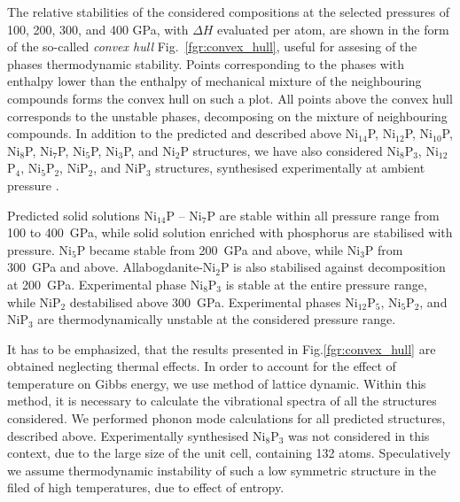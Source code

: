 \documentclass[twoside,twocolumn,9pt]{article}
\begin{document}
The relative stabilities of the considered compositions at the selected pressures of 100, 200, 300, and 400 GPa, with $\Delta H$ evaluated per atom, are shown in the form of the so-called {\it convex hull} Fig.~\ref{fgr:convex_hull}, useful for assesing of the phases thermodynamic stability. 
Points corresponding to the phases with enthalpy lower than the enthalpy of mechanical mixture of the neighbouring compounds forms the convex hull on such a plot.
All points above the convex hull corresponds to the unstable phases, decomposing on the mixture of neighbouring compounds.
In addition to the predicted and described above Ni$_{14}$P, Ni$_{12}$P, Ni$_{10}$P, Ni$_8$P, Ni$_7$P, Ni$_5$P, Ni$_3$P, and Ni$_2$P structures, we have also considered Ni$_8$P$_3$, Ni$_12$P$_4$, Ni$_5$P$_2$, NiP$_2$, and NiP$_3$ structures, synthesised experimentally at ambient pressure \cite{}.

Predicted solid solutions Ni$_{14}$P -- Ni$_7$P are stable within all pressure range from 100 to 400~GPa, while solid solution enriched with phosphorus are stabilised with pressure.
Ni$_5$P became stable from  200~GPa and above, while Ni$_3$P from 300~GPa and above. Allabogdanite-Ni$_2$P is also stabilised against decomposition at 200~GPa.
Experimental phase Ni$_8$P$_3$ is stable at the entire pressure range, while NiP$_2$ destabilised above 300~GPa. Experimental phases Ni$_12$P$_5$, Ni$_5$P$_2$, and NiP$_3$ are thermodynamically unstable at the considered pressure range.

It has to be emphasized, that the results presented in Fig.\ref{fgr:convex_hull} are obtained neglecting thermal effects. 
In order to account for the effect of temperature on Gibbs energy, we use method of lattice dynamic.
Within this method, it is necessary to calculate the vibrational spectra of all the structures considered. 
We performed phonon mode calculations for all predicted structures, described above. 
Experimentally synthesised Ni$_8$P$_3$ was not considered in this context, due to the large size of the unit cell, containing 132 atoms.
Speculatively we assume thermodynamic instability of such a low symmetric structure in the filed of high temperatures, due to effect of entropy.

\end{document}
